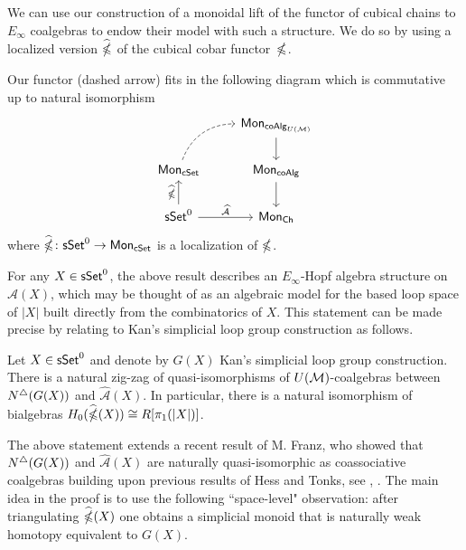 

We can use our construction of a monoidal lift of the functor of cubical chains to $E_\infty$ coalgebras to endow their model with such a structure.
We do so by using a localized version $\widehat {\mathbb{\Omega}}$ of the cubical cobar functor~$\mathbb{\Omega}$.

\begin{theorem} \label{t:2nd main thm in the intro}
    Our functor (dashed arrow) fits in the following diagram which is commutative up to natural isomorphism
    \begin{equation*}
    \begin{tikzcd}
    & \Mon_{\coAlg_{U(\M)}} \arrow[d] \\
    \Mon_{\cSet} \arrow[ru, dashed, out=70, in=180] & \Mon_{\coAlg} \arrow[d] \\
    \sSet^0 \arrow[r, "\widehat{\mathcal A}"] \arrow[u, "\widehat \gcobar"] & \Mon_{\Ch}
    \end{tikzcd}
    \end{equation*}
    where $\widehat{\mathbb{\Omega}} \colon \mathsf{sSet}^0 \to \mathsf{Mon}_{\mathsf{cSet}}$ is a localization of $\mathbb{\Omega}$.
\end{theorem}

For any $X \in \mathsf{sSet}^0$, the above result describes an $E_{\infty}$-Hopf algebra structure on $\widehat{\mathcal A}(X)$, which may be thought of as an algebraic model for the based loop space of $|X|$ built directly from the combinatorics of $X$.
This statement can be made precise by relating to Kan's simplicial loop group construction as follows.

\begin{theorem} \label{t:3rd main thm in the intro}
Let $X \in \mathsf{sSet}^0$ and denote by $G(X)$ Kan's simplicial loop group construction.
There is a natural zig-zag of quasi-isomorphisms of $U(\mathcal{M})$-coalgebras between $N^{\triangle}(G(X))$ and $\widehat{\mathcal A}(X)$.
In particular, there is a natural isomorphism of bialgebras $H_0(\widehat{\mathbb{\Omega}}(X)) \cong R[\pi_1(|X|)]$.
\end{theorem}
The above statement extends a recent result of M. Franz, who showed that $N^{\triangle}(G(X))$ and $\widehat{\mathcal A}(X)$ are naturally quasi-isomorphic as coassociative coalgebras building upon previous results of Hess and Tonks, see \cite{franz2020szczarba}, \cite{hess2010cobar}.
The main idea in the proof is to use the following ``space-level" observation: after triangulating $\widehat{\mathbb{\Omega}}({X})$ one obtains a simplicial monoid that is naturally weak homotopy equivalent to $G(X).$ 



